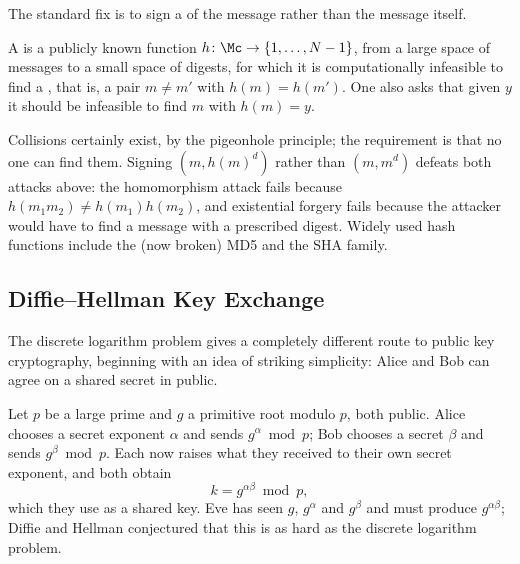 The standard fix is to sign a  of the message rather than the message itself.

\begin{definition}
	A  is a publicly known function $h\colon\Mc\to\{1,\dots,N-1\}$, from a large space of messages to a small space of digests, for which it is computationally infeasible to find a , that is, a pair $m \ne m'$ with $h(m)=h(m')$. One also asks that given $y$ it should be infeasible to find $m$ with $h(m)=y$.
\end{definition}

Collisions certainly exist, by the pigeonhole principle; the requirement is that no one can find them. Signing $(m, h(m)^d)$ rather than $(m,m^d)$ defeats both attacks above: the homomorphism attack fails because $h(m_1m_2)\ne h(m_1)h(m_2)$, and existential forgery fails because the attacker would have to find a message with a prescribed digest. Widely used hash functions include the (now broken) MD5 and the SHA family.

\subsection{Diffie--Hellman Key Exchange}

The discrete logarithm problem gives a completely different route to public key cryptography, beginning with an idea of striking simplicity: Alice and Bob can agree on a shared secret in public.

\begin{example}
	Let $p$ be a large prime and $g$ a primitive root modulo $p$, both public. Alice chooses a secret exponent $\alpha$ and sends $g^\alpha \bmod p$; Bob chooses a secret $\beta$ and sends $g^\beta\bmod p$. Each now raises what they received to their own secret exponent, and both obtain
	$$k = g^{\alpha\beta}\bmod p,$$
	which they use as a shared key. Eve has seen $g$, $g^\alpha$ and $g^\beta$ and must produce $g^{\alpha\beta}$; Diffie and Hellman conjectured that this is as hard as the discrete logarithm problem.
\end{example}

\begin{center}
\end{center}

